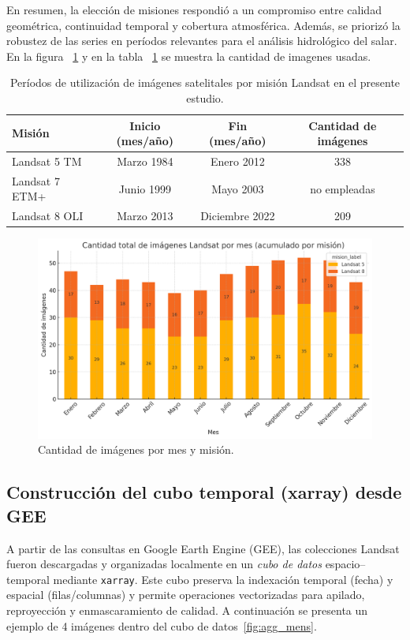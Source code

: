 En resumen, la elección de misiones respondió a un compromiso entre calidad geométrica, continuidad temporal y cobertura atmosférica. Además,  se priorizó la robustez de las series en períodos relevantes para el análisis hidrológico del salar. En la figura ~\ref{fig:cant_imagenes} y en la tabla ~\ref{tab:periodos_landsat} se muestra la cantidad de imagenes usadas. 


\begin{table}[h]
	\centering
	\caption[Períodos Landsat]{Períodos de utilización de imágenes satelitales por misión Landsat en el presente estudio.}
	\begin{tabular}{l c c c}    
		\toprule
		\textbf{Misión}     & \textbf{Inicio (mes/año)} & \textbf{Fin (mes/año)} & \textbf{Cantidad de imágenes} \\
		\midrule
		Landsat 5 TM        & Marzo 1984   & Enero 2012        & 338 \\		
		Landsat 7 ETM+      & Junio 1999   & Mayo 2003         & no empleadas \\
		Landsat 8 OLI       & Marzo 2013   & Diciembre 2022    & 209 \\
		\bottomrule
	\end{tabular}
        \hline
	\label{tab:periodos_landsat}
\end{table}

\begin{figure}[ht]
        \centering
        \includegraphics[scale=.4]
        {Figures/fig12.png}
        \caption{Cantidad de imágenes por mes y misión.}
        \label{fig:cant_imagenes}
\end{figure}

\subsection{Construcción del cubo temporal (xarray) desde GEE}
A partir de las consultas en Google Earth Engine (GEE), las colecciones Landsat fueron descargadas y organizadas localmente en un \emph{cubo de datos} espacio–temporal mediante \texttt{xarray}. Este cubo preserva la indexación temporal (fecha) y espacial (filas/columnas) y permite operaciones vectorizadas para apilado, reproyección y enmascaramiento de calidad. A continuación se presenta un ejemplo de 4 imágenes dentro del cubo de datos~\ref{fig:agg_mens}.

